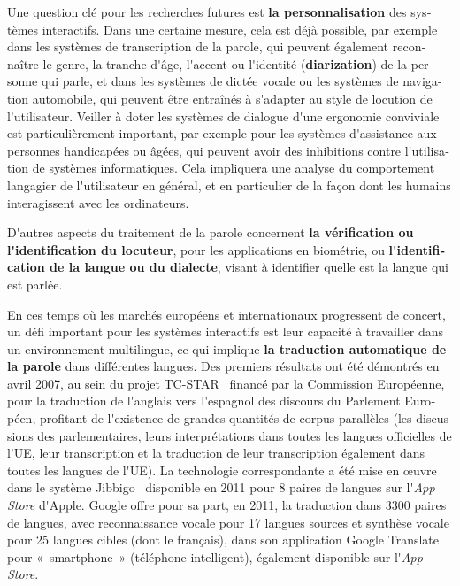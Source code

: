 \begin{french}
\begin{multicols}{2}
Une question clé pour les recherches futures est {\bf la personnalisation}
des systèmes interactifs. Dans une certaine mesure, cela est déjà
possible, par exemple dans les systèmes de transcription de la parole,
qui peuvent également reconnaître le genre, la tranche d{\mbox '}âge, l{\mbox '}accent
ou l{\mbox '}identité ({\bf diarization}) de la personne qui parle, et dans les
systèmes de dictée vocale ou les systèmes de navigation automobile,
qui peuvent être entraînés à s{\mbox '}adapter au style de locution de
l{\mbox '}utilisateur. Veiller à doter les systèmes de dialogue d{\mbox '}une ergonomie
conviviale est particulièrement important, par exemple pour les systèmes
d{\mbox '}assistance aux personnes handicapées ou âgées, qui peuvent avoir des
inhibitions contre l{\mbox '}utilisation de systèmes informatiques. Cela
impliquera une analyse du comportement langagier de l{\mbox '}utilisateur en
général, et en particulier de la façon dont les humains interagissent
avec les ordinateurs.

D{\mbox '}autres aspects du traitement de la parole concernent {\bf la vérification
ou l{\mbox '}identification du locuteur}, pour les applications en biométrie,
ou {\bf l{\mbox '}identification de la langue ou du dialecte}, visant à identifier
quelle est la langue qui est parlée.

En ces temps où les marchés européens et internationaux progressent de
concert, un défi important pour les systèmes interactifs est leur
capacité à travailler dans un environnement multilingue, ce qui
implique {\bf la traduction automatique de la parole} dans différentes
langues. Des premiers résultats ont été démontrés en avril 2007, au
sein du projet TC-STAR~\cite{tcstarurl} financé par la Commission
Européenne, pour la traduction de l{\mbox '}anglais vers l{\mbox
  '}espagnol des discours du Parlement Européen, profitant de l{\mbox
  '}existence de grandes quantités de corpus parallèles (les
discussions des parlementaires, leurs interprétations dans toutes les
langues officielles de l{\mbox '}UE, leur transcription et la
traduction de leur transcription également dans toutes les langues de
l{\mbox '}UE). La technologie correspondante a été mise en œuvre dans
le système Jibbigo~\cite{jibbigo} disponible en 2011 pour 8 paires de langues
sur l{\mbox '}{\em {\mbox App Store}} d{\mbox '}Apple. Google offre
pour sa part, en 2011, la traduction dans 3300 paires de langues, avec
reconnaissance vocale pour 17 langues sources et synthèse vocale pour
25 langues cibles (dont le français), dans son application Google
Translate pour «~smartphone~» (téléphone intelligent), également
disponible sur l{\mbox '}{\em {\mbox App Store}}.


\end{multicols}
\end{french}
